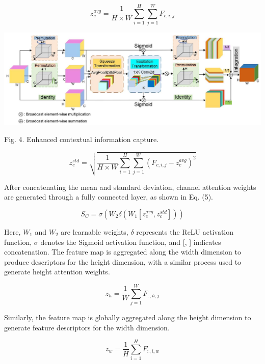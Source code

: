 \documentclass{article}
\begin{document}
\begin{equation*}
z_{c}^{a v g}=\frac{1}{H \times W} \sum_{i=1}^{H} \sum_{j=1}^{W} F_{c, i, j} \tag{3}
\end{equation*}


\begin{center}
\includegraphics[max width=\textwidth]{2025_08_05_34f8389150f57116e76bg-06}
\end{center}

Fig. 4. Enhanced contextual information capture.


\begin{equation*}
z_{c}^{s t d}=\sqrt{\frac{1}{H \times W} \sum_{i=1}^{H} \sum_{j=1}^{W}\left(F_{c, i, j}-z_{c}^{a v g}\right)^{2}} \tag{4}
\end{equation*}


After concatenating the mean and standard deviation, channel attention weights are generated through a fully connected layer, as shown in Eq. (5).


\begin{equation*}
S_{C}=\sigma\left(W_{2} \delta\left(W_{1}\left[z_{c}^{a v g}, z_{c}^{s t d}\right]\right)\right) \tag{5}
\end{equation*}


Here, $W_{1}$ and $W_{2}$ are learnable weights, $\delta$ represents the ReLU activation function, $\sigma$ denotes the Sigmoid activation function, and [, ] indicates concatenation. The feature map is aggregated along the width dimension to produce descriptors for the height dimension, with a similar process used to generate height attention weights.


\begin{equation*}
z_{h}=\frac{1}{W} \sum_{j=1}^{W} F_{:, h, j} \tag{6}
\end{equation*}


Similarly, the feature map is globally aggregated along the height dimension to generate feature descriptors for the width dimension.


\begin{equation*}
z_{w}=\frac{1}{H} \sum_{i=1}^{H} F_{:, i, w} \tag{7}
\end{equation*}
\end{document}
